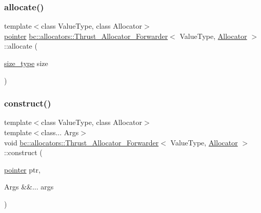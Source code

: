 \subsubsection{\texorpdfstring{allocate()}{allocate()}}
{\footnotesize\ttfamily template$<$class Value\+Type, class Allocator$>$ \\
\hyperlink{structbc_1_1allocators_1_1Thrust__Allocator__Forwarder_ad65c1d99f764c14eb0f65dc78d36e56a}{pointer} \hyperlink{structbc_1_1allocators_1_1Thrust__Allocator__Forwarder}{bc\+::allocators\+::\+Thrust\+\_\+\+Allocator\+\_\+\+Forwarder}$<$ Value\+Type, \hyperlink{classbc_1_1allocators_1_1Allocator}{Allocator} $>$\+::allocate (\begin{DoxyParamCaption}\item[{\hyperlink{structbc_1_1allocators_1_1Thrust__Allocator__Forwarder_a0d59ede93a4c3e6530494375e1e6821e}{size\+\_\+type}}]{size }\end{DoxyParamCaption})\hspace{0.3cm}{\ttfamily [inline]}}

\mbox{\label{structbc_1_1allocators_1_1Thrust__Allocator__Forwarder_a95b76730a7c648d49b47cb203d39699f}} 
\subsubsection{\texorpdfstring{construct()}{construct()}}
{\footnotesize\ttfamily template$<$class Value\+Type, class Allocator$>$ \\
template$<$class... Args$>$ \\
void \hyperlink{structbc_1_1allocators_1_1Thrust__Allocator__Forwarder}{bc\+::allocators\+::\+Thrust\+\_\+\+Allocator\+\_\+\+Forwarder}$<$ Value\+Type, \hyperlink{classbc_1_1allocators_1_1Allocator}{Allocator} $>$\+::construct (\begin{DoxyParamCaption}\item[{\hyperlink{structbc_1_1allocators_1_1Thrust__Allocator__Forwarder_ad65c1d99f764c14eb0f65dc78d36e56a}{pointer}}]{ptr,  }\item[{Args \&\&...}]{args }\end{DoxyParamCaption})\hspace{0.3cm}{\ttfamily [inline]}}

